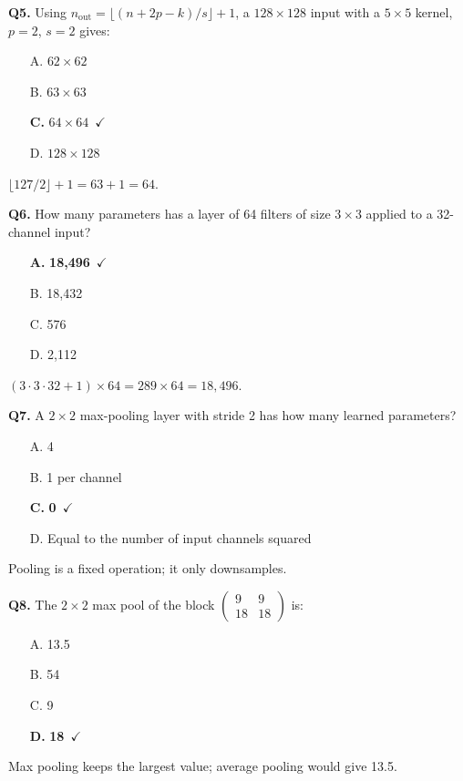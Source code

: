 \documentclass[11pt]{article}
\begin{document}
{\noindent\textbf{Q5.} Using $n_{\text{out}}=\lfloor(n+2p-k)/s\rfloor+1$, a $128\times128$ input with a $5\times5$ kernel, $p=2$, $s=2$ gives:\begin{itemize}[leftmargin=2.2em,itemsep=0pt,topsep=1pt]\item[A.] $62\times62$\item[B.] $63\times63$\item[\textbf{C.}] \textbf{$64\times64$}~{\color{GrnN}$\checkmark$}\item[D.] $128\times128$\end{itemize} $\lfloor127/2\rfloor+1=63+1=64$.\par\medskip

\noindent\textbf{Q6.} How many parameters has a layer of 64 filters of size $3\times3$ applied to a 32-channel input?\begin{itemize}[leftmargin=2.2em,itemsep=0pt,topsep=1pt]\item[\textbf{A.}] \textbf{18,496}~{\color{GrnN}$\checkmark$}\item[B.] 18,432\item[C.] 576\item[D.] 2,112\end{itemize} $(3\cdot3\cdot32+1)\times64=289\times64=18{,}496$.\par\medskip

\noindent\textbf{Q7.} A $2\times2$ max-pooling layer with stride 2 has how many learned parameters?\begin{itemize}[leftmargin=2.2em,itemsep=0pt,topsep=1pt]\item[A.] 4\item[B.] 1 per channel\item[\textbf{C.}] \textbf{0}~{\color{GrnN}$\checkmark$}\item[D.] Equal to the number of input channels squared\end{itemize} Pooling is a fixed operation; it only downsamples.\par\medskip

\noindent\textbf{Q8.} The $2\times2$ max pool of the block $\begin{pmatrix}9&9\\18&18\end{pmatrix}$ is:\begin{itemize}[leftmargin=2.2em,itemsep=0pt,topsep=1pt]\item[A.] 13.5\item[B.] 54\item[C.] 9\item[\textbf{D.}] \textbf{18}~{\color{GrnN}$\checkmark$}\end{itemize} Max pooling keeps the largest value; average pooling would give 13.5.\par\medskip

}
\end{document}
